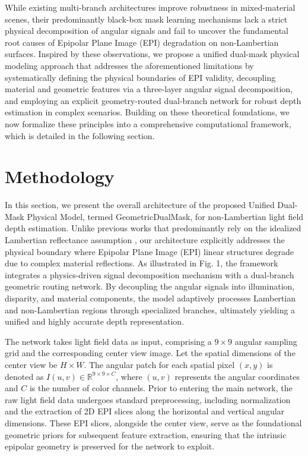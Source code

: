 \documentclass[lettersize,journal]{IEEEtran}
\begin{document}
While existing multi-branch architectures improve robustness in mixed-material scenes, their predominantly black-box mask learning mechanisms lack a strict physical decomposition of angular signals and fail to uncover the fundamental root causes of Epipolar Plane Image (EPI) degradation on non-Lambertian surfaces. Inspired by these observations, we propose a unified dual-mask physical modeling approach that addresses the aforementioned limitations by systematically defining the physical boundaries of EPI validity, decoupling material and geometric features via a three-layer angular signal decomposition, and employing an explicit geometry-routed dual-branch network for robust depth estimation in complex scenarios. Building on these theoretical foundations, we now formalize these principles into a comprehensive computational framework, which is detailed in the following section.

\section{Methodology}

In this section, we present the overall architecture of the proposed Unified Dual-Mask Physical Model, termed GeometricDualMask, for non-Lambertian light field depth estimation. Unlike previous works that predominantly rely on the idealized Lambertian reflectance assumption \cite{realtime}, our architecture explicitly addresses the physical boundary where Epipolar Plane Image (EPI) \cite{realtime} linear structures degrade due to complex material reflections. As illustrated in Fig. 1, the framework integrates a physics-driven signal decomposition mechanism with a dual-branch geometric routing network. By decoupling the angular signals into illumination, disparity, and material components, the model adaptively processes Lambertian and non-Lambertian regions through specialized branches, ultimately yielding a unified and highly accurate depth representation.

The network takes light field data as input, comprising a $9 \times 9$ angular sampling grid and the corresponding center view image. Let the spatial dimensions of the center view be $H \times W$. The angular patch for each spatial pixel $(x, y)$ is denoted as $I(u,v) \in \mathbb{R}^{9 \times 9 \times C}$, where $(u,v)$ represents the angular coordinates and $C$ is the number of color channels. Prior to entering the main network, the raw light field data undergoes standard preprocessing, including normalization and the extraction of 2D EPI slices along the horizontal and vertical angular dimensions. These EPI slices, alongside the center view, serve as the foundational geometric priors for subsequent feature extraction, ensuring that the intrinsic epipolar geometry is preserved for the network to exploit.
\end{document}
